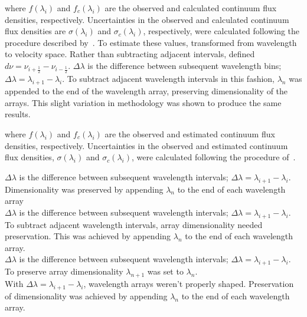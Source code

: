  where $f(\lambda_{i})$ and $f_{c}(\lambda_{i})$ are the observed 
and calculated continuum flux densities, respectively.  Uncertainties in the 
observed and calculated continuum flux densities are $\sigma(\lambda_{i})$ and 
$\sigma_{c}(\lambda_{i})$, respectively, were calculated following the procedure 
described by~\cite{Sembach_1992}.  To estimate these values, \cite{Sembach_1992} 
transformed from wavelength to velocity space.  Rather than subtracting adjacent intervals, 
\cite{Sembach_1992} defined $d\nu = \nu_{i+\frac{1}{2}} - \nu_{i-\frac{1}{2}}$.  
$\Delta\lambda$ is the difference between subsequent wavelength bins; 
$\Delta\lambda = \lambda_{i+1} - \lambda_{i}$.  To subtract adjacent 
wavelength intervals in this fashion, $\lambda_{n}$ was appended to the 
end of the wavelength array, preserving dimensionality of the arrays.  
This slight variation in methodology was shown to produce the same results.



 where $f(\lambda_{i})$ and $f_{c}(\lambda_{i})$ are the observed 
and estimated continuum flux densities, respectively.  Uncertainties in the 
observed and estimated continuum flux densities, $\sigma(\lambda_{i})$ and 
$\sigma_{c}(\lambda_{i})$, were calculated following the procedure 
of~\cite{Sembach_1992}.  


	 $\Delta\lambda$ is the difference between subsequent 
	wavelength intervals; $\Delta\lambda = \lambda_{i+1} - \lambda_{i}$.   
	Dimensionality was preserved by appending $\lambda_{n}$ to the end 
	of each wavelength array\\

	 $\Delta\lambda$ is the difference between subsequent 
	wavelength intervals; $\Delta\lambda = \lambda_{i+1} - \lambda_{i}$.   
	To subtract adjacent wavelength intervals, array dimensionality needed 
	preservation.  This was achieved by appending $\lambda_{n}$ to the end 
	of each wavelength array.\\

	 $\Delta\lambda$ is the difference between subsequent 
	wavelength intervals; $\Delta\lambda = \lambda_{i+1} - \lambda_{i}$.   
	To preserve array dimensionality $\lambda_{n+1}$ was set to $\lambda_{n}$.\\

	 With $\Delta\lambda = \lambda_{i+1} - \lambda_{i}$, wavelength 
	arrays weren't properly shaped.  Preservation of dimensionality was achieved 
	by appending $\lambda_{n}$ to the end of each wavelength array.\\


